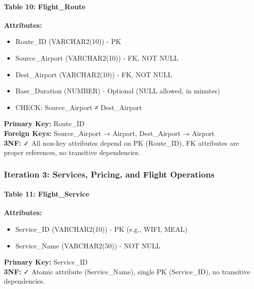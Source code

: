 \documentclass[12pt,a4paper,openany]{report}
\begin{document}
\paragraph{Table 10: Flight\_Route}
\textbf{Attributes:} 
\begin{itemize}
    \item Route\_ID (VARCHAR2(10)) - PK
    \item Source\_Airport (VARCHAR2(10)) - FK, NOT NULL
    \item Dest\_Airport (VARCHAR2(10)) - FK, NOT NULL
    \item Base\_Duration (NUMBER) - Optional (NULL allowed, in minutes)
    \item CHECK: Source\_Airport ≠ Dest\_Airport
\end{itemize}
\textbf{Primary Key:} Route\_ID\\
\textbf{Foreign Keys:} Source\_Airport → Airport, Dest\_Airport → Airport\\
\textbf{3NF:} ✓ All non-key attributes depend on PK (Route\_ID), FK attributes are proper references, no transitive dependencies.

\subsubsection{Iteration 3: Services, Pricing, and Flight Operations}

\paragraph{Table 11: Flight\_Service}
\textbf{Attributes:} 
\begin{itemize}
    \item Service\_ID (VARCHAR2(10)) - PK (e.g., WIFI, MEAL)
    \item Service\_Name (VARCHAR2(50)) - NOT NULL
\end{itemize}
\textbf{Primary Key:} Service\_ID\\
\textbf{3NF:} ✓ Atomic attribute (Service\_Name), single PK (Service\_ID), no transitive dependencies.
\end{document}
